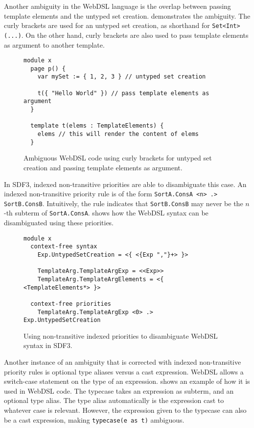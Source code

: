       Another ambiguity in the WebDSL language is the overlap between passing template elements and the untyped set creation.  demonstrates the ambiguity. The curly brackets are used for an untyped set creation, as shorthand for \texttt{Set<Int>(...)}. On the other hand, curly brackets are also used to pass template elements as argument to another template.

      \begin{figure}
        \begin{verbatim}
module x
  page p() {
    var mySet := { 1, 2, 3 } // untyped set creation

    t({ "Hello World" }) // pass template elements as argument
  }

  template t(elems : TemplateElements) {
    elems // this will render the content of elems
  }
        \end{verbatim}
        \caption{\label{fig:sdf3-webdsl-untyped-set}Ambiguous WebDSL code using curly brackets for untyped set creation and passing template elements as argument.}
      \end{figure}

      In SDF3, indexed non-transitive priorities are able to disambiguate this case. An indexed non-transitive priority rule is of the form \texttt{SortA.ConsA <n> .> SortB.ConsB}. Intuitively, the rule indicates that \texttt{SortB.ConsB} may never be the $n$-th subterm of \texttt{SortA.ConsA}.  shows how the WebDSL syntax can be disambiguated using these priorities.

      \begin{figure}
        \begin{verbatim}
module x
  context-free syntax
    Exp.UntypedSetCreation = <{ <{Exp ","}+> }>

    TemplateArg.TemplateArgExp = <<Exp>>
    TemplateArg.TemplateArgElements = <{ <TemplateElements*> }>

  context-free priorities
    TemplateArg.TemplateArgExp <0> .> Exp.UntypedSetCreation
        \end{verbatim}
        \caption{\label{fig:sdf3-non-transitive-priorities}Using non-transitive indexed priorities to disambiguate WebDSL syntax in SDF3.}
      \end{figure}

      Another instance of an ambiguity that is corrected with indexed non-transitive priority rules is optional type aliases versus a cast expression. WebDSL allows a switch-case statement on the type of an expression.  shows an example of how it is used in WebDSL code. The typecase takes an expression as subterm, and an optional type alias. The type alias automatically is the expression cast to whatever case is relevant. However, the expression given to the typecase can also be a cast expression, making \texttt{typecase(e as t)} ambiguous.

